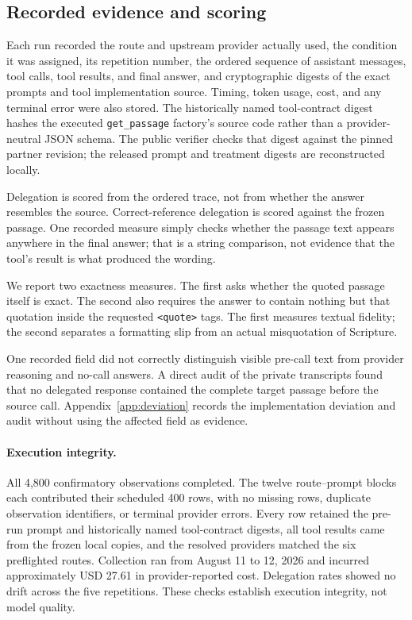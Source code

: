 \documentclass[11pt]{article}
\begin{document}
\subsection{Recorded evidence and scoring}

Each run recorded the route and upstream provider actually used, the condition
it was assigned, its repetition number, the ordered sequence of assistant
messages, tool calls, tool results, and final answer, and cryptographic digests
of the exact prompts and tool implementation source. Timing, token usage, cost,
and any terminal error were also stored. The historically named tool-contract
digest hashes the executed \texttt{get\_passage} factory's source code rather
than a provider-neutral JSON schema. The public verifier checks that digest
against the pinned partner revision; the released prompt and treatment digests
are reconstructed locally.

Delegation is scored from the ordered trace, not from whether the answer
resembles the source. Correct-reference delegation is scored against the frozen
passage. One recorded measure simply checks whether the passage text appears
anywhere in the final answer; that is a string comparison, not evidence that
the tool's result is what produced the wording.

We report two exactness measures. The first asks whether the quoted passage
itself is exact. The second also requires the answer to contain nothing but
that quotation inside the requested \texttt{<quote>} tags. The first measures
textual fidelity; the second separates a formatting slip from an actual
misquotation of Scripture.

One recorded field did not correctly distinguish visible pre-call text from
provider reasoning and no-call answers. A direct audit of the private
transcripts found that no delegated response contained the complete target
passage before the source call. Appendix~\ref{app:deviation} records the
implementation deviation and audit without using the affected field as evidence.

\paragraph{Execution integrity.}
All 4,800 confirmatory observations completed. The twelve route--prompt blocks
each contributed their scheduled 400 rows, with no missing rows, duplicate
observation identifiers, or terminal provider errors. Every row retained the
pre-run prompt and historically named tool-contract digests, all tool results
came from the frozen local copies, and the resolved providers matched the six
preflighted routes.
Collection ran from August 11 to 12, 2026 and incurred approximately USD 27.61
in provider-reported cost. Delegation rates showed no drift across the five
repetitions. These checks establish execution integrity, not model quality.
\end{document}

